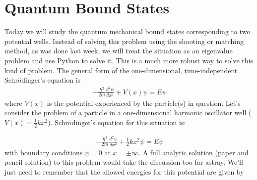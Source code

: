 \chapter[Quantum Bound States]{Quantum Bound States}
\label{ch:qbs}

Today we will study the quantum mechanical bound states corresponding
to two potential wells.  Instead of solving this problem using the
shooting or matching method, as was done last week, we will treat the
situation as an eigenvalue problem and use Python to solve it.  This
is a much more robust way to solve this kind of problem.
The general form of the one-dimensional, time-independent
Schr\"{o}dinger's equation is
\begin{align}
-\frac{\hbar^2}{2m} \frac{d^2\psi}{dx^2} + V(x) \psi = E \psi
\end{align}
where $V(x)$ is the potential experienced by the particle(s) in question.  Let's consider the problem of a particle in a one-dimensional harmonic oscillator well ($V(x)  = \frac{1}{2} k x^2$).  Schr\"{o}dinger's equation for this situation is:

\begin{align}
-\frac{\hbar^2}{2m} \frac{d^2\psi}{dx^2} + \frac{1}{2} k x^2\psi = E \psi\label{equ:hOscil}
\end{align}
with boundary conditions $\psi = 0$ at $x = \pm \infty$. A full
analytic solution (paper and pencil solution) to this problem would
take the discussion too far astray.  We'll just need to remember that
the allowed energies for this potential are given by

